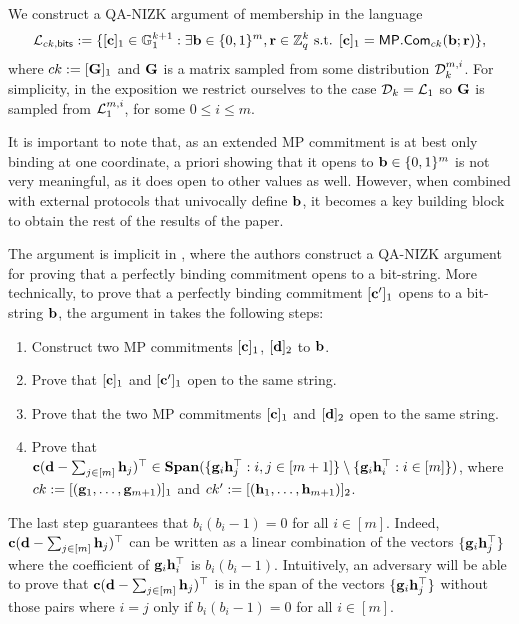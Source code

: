 We construct a QA-NIZK argument of membership in the language
$$
\mathcal{L}_{ck,\mathsf{bits}} := \{[\mathbf{c}]_1\in\mathbb{G}_1^{k+1} : \exists \mathbf{b}\in\{0,1\}^m,\mathbf{r}\in\mathbb{Z}_q^k \text{ s.t. } [\mathbf{c}]_1 = \mathsf{MP}.\mathsf{Com}_{ck}(\mathbf{b};\mathbf{r})\},
$$
where $ck:=[\mathbf{{G}}]_1$ and $\mathbf{{G}}$ is a matrix sampled from 
some distribution $\mathcal{D}_k^{m,i}$. For simplicity, in the exposition we restrict ourselves to the case $\mathcal{D}_k=\mathcal{L}_{1}$ so  $\mathbf{{G}}$ is sampled from $\mathcal{L}_1^{m,i}$, for some $0 \leq i \leq m$.

It is important to note that, as an extended MP commitment is at best only binding at one coordinate, a priori showing that it opens to $\mathbf{b} \in \{0,1\}^m$ is not very meaningful, as it does open to other values as well. However, when combined with external protocols that univocally define $\mathbf{b}$, it becomes a key building block to obtain the rest of the results of the paper.  

The argument is implicit in \cite{AC:GonHevRaf15}, where the authors construct a QA-NIZK argument for proving that a perfectly binding commitment opens to a bit-string. More technically, to prove that a  perfectly binding commitment $[\mathbf{c}']_1$ opens to a bit-string $\mathbf{b}$, the argument in \cite{AC:GonHevRaf15} takes the following steps:
\begin{enumerate}
\item Construct two MP commitments $[\mathbf{c}]_1$, 
$[\mathbf{d}]_2$ to $\mathbf{b}$. 
\item Prove that $[\mathbf{c}]_1$ and $[\mathbf{c}']_1$ open to the same string. 
\item Prove that the two MP commitments $[\mathbf{c}]_1$ and $[\mathbf{d}]_2$ open to the same string.
\item Prove that $\mathbf{c}(\mathbf{d}-\sum_{j \in [m]}
\mathbf{h}_j)^\top\in\mathbf{Span}(\{\mathbf{g}_i\mathbf{h}_j^\top:i,j\in[m+1]\}\setminus\{\mathbf{g}_i\mathbf{h}_i^\top:i\in[m]\})$, where $ck:=[(\mathbf{g}_1,\ldots,\mathbf{g}_{m+1})]_1$ and $ck':=[(\mathbf{h}_1,\ldots,\mathbf{h}_{m+1})]_2$.
\end{enumerate}
The last step guarantees that 
$b_i(b_i-1)=0$ for all $i \in [m]$. Indeed, 
$\mathbf{c}(\mathbf{d}-\sum_{j \in [m]}
\mathbf{h}_j)^\top$ can be written as a linear combination of the vectors $\{\mathbf{g}_i\mathbf{h}_j^\top\}$ where the coefficient of $\mathbf{g}_i\mathbf{h}_i^{\top}$ is $b_i(b_i-1)$. Intuitively, an adversary will be able to prove that $\mathbf{c}(\mathbf{d}-\sum_{j \in [m]}
\mathbf{h}_j)^\top$ is in the span of the vectors  $\{\mathbf{g}_i\mathbf{h}_j^\top\}$ without those pairs where $i=j$ only if $b_i(b_i-1)=0$ for all $i \in [m]$. 


